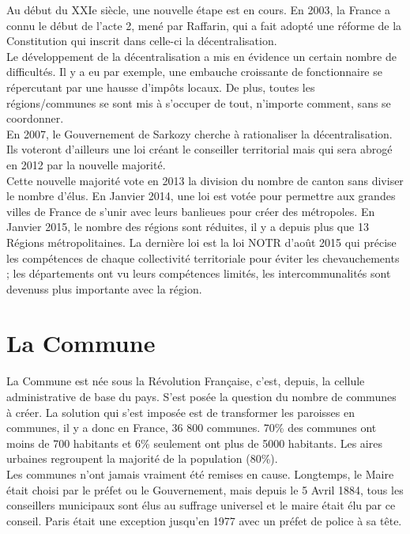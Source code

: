 \documentclass[12pt, a4paper, openany]{book}
\begin{document}
Au début du XXIe siècle, une nouvelle étape est en cours. En 2003, la France a connu le début de l'acte 2, mené par Raffarin, qui a fait adopté une réforme de la Constitution qui inscrit dans celle-ci la décentralisation. \\
Le développement de la décentralisation a mis en évidence un certain nombre de difficultés. Il y a eu par exemple, une embauche croissante de fonctionnaire se répercutant par une hausse d'impôts locaux. De plus, toutes les régions/communes se sont mis à s'occuper de tout, n'importe comment, sans se coordonner. \\
En 2007, le Gouvernement de Sarkozy cherche à rationaliser la décentralisation. Ils voteront d'ailleurs une loi créant le conseiller territorial mais qui sera abrogé en 2012 par la nouvelle majorité. \\
Cette nouvelle majorité vote en 2013 la division du nombre de canton sans diviser le nombre d'élus. En Janvier 2014, une loi est votée pour permettre aux grandes villes de France de s'unir avec leurs banlieues pour créer des métropoles. En Janvier 2015, le nombre des régions sont réduites, il y a depuis plus que 13 Régions métropolitaines. La dernière loi est la loi NOTR d'août 2015 qui précise les compétences de chaque collectivité territoriale pour éviter les chevauchements ; les départements ont vu leurs compétences limités, les intercommunalités sont devenuss plus importante avec la région. \\

\section{La Commune}

La Commune est née sous la Révolution Française, c'est, depuis, la cellule administrative de base du pays. S'est posée la question du nombre de communes à créer. La solution qui s'est imposée est de transformer les paroisses en communes, il y a donc en France, 36 800 communes. 70\% des communes ont moins de 700 habitants et 6\% seulement ont plus de 5000 habitants. Les aires urbaines regroupent la majorité de la population (80\%). \\
Les communes n'ont jamais vraiment été remises en cause. Longtemps, le Maire était choisi par le préfet ou le Gouvernement, mais depuis le 5 Avril 1884, tous les conseillers municipaux sont élus au suffrage universel et le maire était élu par ce conseil. Paris était une exception jusqu'en 1977 avec un préfet de police à sa tête.  
\end{document}
